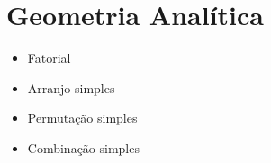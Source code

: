\chapter{Geometria Analítica}
	\begin{itemize}
		\item Fatorial
		\item Arranjo simples
		\item Permutação simples
		\item Combinação simples
	\end{itemize}